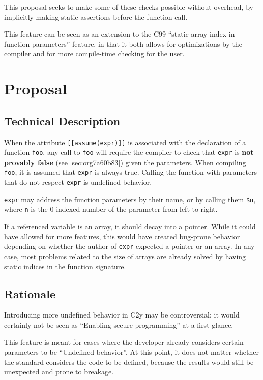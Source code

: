 \documentclass[a4paper, 12pt]{article}
\begin{document}
This proposal seeks to make some of these checks possible without overhead, by implicitly
making static assertions before the function call.

This feature can be seen as an extension to the C99 ``static array index in
function parameters'' feature, in that it both allows for optimizations by the
compiler and for more compile-time checking for the user.
\section{Proposal}
\label{sec:org7e11dbf}
\subsection{Technical Description}
\label{sec:org5227bef}
When the attribute \texttt{[[assume(expr)]]} is associated with the declaration of a
function \texttt{foo}, any call to \texttt{foo} will require the compiler to check that \texttt{expr}
is \textbf{not provably false} (see \ref{sec:org7a60b83}) given the parameters.
When compiling \texttt{foo}, it is assumed that \texttt{expr} is always true.  Calling the
function with parameters that do not respect \texttt{expr} is undefined behavior.

\texttt{expr} may address the function parameters by their name, or by calling them
\texttt{\$n}, where \texttt{n} is the 0-indexed number of the parameter from left to right.

If a referenced variable is an array, it should decay into a pointer.  While it
could have allowed for more features, this would have created bug-prone behavior
depending on whether the author of \texttt{expr} expected a pointer or an array.  In any
case, most problems related to the size of arrays are already solved by having
static indices in the function signature.
\subsection{Rationale}
\label{sec:orgfa252a4}
Introducing more undefined behavior in C2y may be controversial; it would certainly
not be seen as ``Enabling secure programming'' at a first glance.

This feature is meant for cases where the developer already considers certain
parameters to be ``Undefined behavior''.  At this point, it does not matter
whether the standard considers the code to be defined, because the results would
still be unexpected and prone to breakage.
\end{document}
